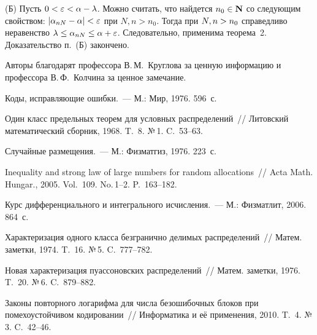 \begin{multicols}{2}
(Б) Пусть $0<\varepsilon\hm<\alpha\hm-\lambda$. Можно считать, что
найдется $n_0\hm\in\mathbf{N}$ со следующим свойством:
$|\alpha_{nN}\hm-\alpha|<\varepsilon$ при $N,n>n_0$. Тогда  при
$N,n\hm>n_0$ справедливо неравенство
$\lambda\hm\le\alpha_{nN}\hm\le\alpha\hm+\varepsilon$. Следовательно,
применима теорема~2. Доказательство п.~(Б) закончено.

\bigskip

Авторы благодарят профессора В.\,М.~Круглова за ценную информацию и
профессора В.\,Ф.~Колчина за ценное замечание.

  {\small\frenchspacing
{%
\begin{thebibliography}{9}

 Коды, исправляющие ошибки.~--- М.:
Мир, 1976. 596~с.

 Один класс предельных теорем для условных
распределений~// Литовский математический сборник, 1968. T.~8. №\,1. C.~53--63.


 Случайные
размещения.~--- М.: Физматгиз, 1976.  223~с.

  Inequality and strong law of
large numbers for random allocations~// Acta Math. Hungar., 2005.
Vol.~109. No.\,1--2. P.~163--182.

 Курс дифференциального и интегрального
исчисления.~---  М.: Физматлит, 2006.  864~с.


  Характеризация одного класса безгранично
делимых распределений~// Матем. заметки, 1974. T.~16. №\,5. C.~777--782.


  Новая характеризация пуассоновских
распределений~// Матем. заметки, 1976. T.~20. №\,6. C.~879--882.

  \label{end\stat}

 Законы повторного логарифма для
числа безошибочных блоков при помехоустойчивом кодировании~// Информатика и её 
применения, 2010. T.~4. №\,3. C.~42--46.

 \end{thebibliography}
}
}


\end{multicols}       